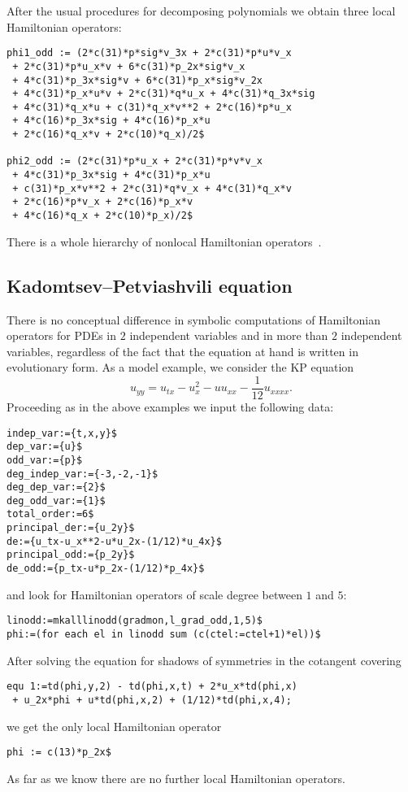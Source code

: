 After the usual procedures for decomposing polynomials we obtain three local
Hamiltonian operators:
\begin{small}
\begin{verbatim}
phi1_odd := (2*c(31)*p*sig*v_3x + 2*c(31)*p*u*v_x
 + 2*c(31)*p*u_x*v + 6*c(31)*p_2x*sig*v_x
 + 4*c(31)*p_3x*sig*v + 6*c(31)*p_x*sig*v_2x
 + 4*c(31)*p_x*u*v + 2*c(31)*q*u_x + 4*c(31)*q_3x*sig
 + 4*c(31)*q_x*u + c(31)*q_x*v**2 + 2*c(16)*p*u_x
 + 4*c(16)*p_3x*sig + 4*c(16)*p_x*u
 + 2*c(16)*q_x*v + 2*c(10)*q_x)/2$

phi2_odd := (2*c(31)*p*u_x + 2*c(31)*p*v*v_x
 + 4*c(31)*p_3x*sig + 4*c(31)*p_x*u
 + c(31)*p_x*v**2 + 2*c(31)*q*v_x + 4*c(31)*q_x*v
 + 2*c(16)*p*v_x + 2*c(16)*p_x*v
 + 4*c(16)*q_x + 2*c(10)*p_x)/2$
\end{verbatim}
\end{small}
There is a whole hierarchy of nonlocal Hamiltonian operators~\cite{KerstenKrasilshchikVerboretsky:2004}.


\subsection{Kadomtsev--Petviashvili equation}
\label{cdesec:mult-case}

There is no conceptual difference in symbolic computations of Hamiltonian
operators for PDEs in $2$ independent variables and in more than $2$
independent variables, regardless of the fact that the equation at hand is
written in evolutionary form. As a model example, we consider the KP equation
\begin{equation}
  \label{eq:3}
  u_{yy}=u_{tx}-u_x^2-uu_{xx}-\frac{1}{12}u_{xxxx}.
\end{equation}
Proceeding as in the above examples we input the following data:
\begin{verbatim}
indep_var:={t,x,y}$
dep_var:={u}$
odd_var:={p}$
deg_indep_var:={-3,-2,-1}$
deg_dep_var:={2}$
deg_odd_var:={1}$
total_order:=6$
principal_der:={u_2y}$
de:={u_tx-u_x**2-u*u_2x-(1/12)*u_4x}$
principal_odd:={p_2y}$
de_odd:={p_tx-u*p_2x-(1/12)*p_4x}$
\end{verbatim}
and look for Hamiltonian operators of scale degree between $1$ and $5$:
\begin{verbatim}
linodd:=mkalllinodd(gradmon,l_grad_odd,1,5)$
phi:=(for each el in linodd sum (c(ctel:=ctel+1)*el))$
\end{verbatim}
After solving the equation for shadows of symmetries in the cotangent covering
\begin{verbatim}
equ 1:=td(phi,y,2) - td(phi,x,t) + 2*u_x*td(phi,x)
 + u_2x*phi + u*td(phi,x,2) + (1/12)*td(phi,x,4);
\end{verbatim}
we get the only local Hamiltonian operator
\begin{verbatim}
phi := c(13)*p_2x$
\end{verbatim}
As far as we know there are no further local Hamiltonian operators.

